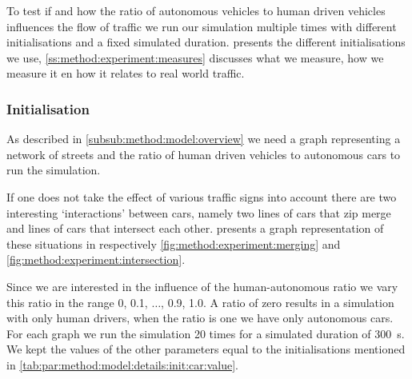 To test if and how the ratio of autonomous vehicles to human driven vehicles influences the flow of traffic we run our simulation multiple times with different initialisations and a fixed simulated duration.  presents the different initialisations we use, \cref{ss:method:experiment:measures} discusses what we measure, how we measure it en how it relates to real world traffic. 

\subsubsection{Initialisation}
\label{ss:method:experiment:init}
As described in \cref{subsub:method:model:overview} we need a graph representing a network of streets and the ratio of human driven vehicles to autonomous cars to run the simulation. 

If one does not take the effect of various traffic signs into account there are two interesting `interactions' between cars, namely two lines of cars that zip merge and lines of cars that intersect each other.  presents a graph representation of these situations in respectively \cref{fig:method:experiment:merging} and \cref{fig:method:experiment:intersection}.

Since we are interested in the influence of the human-autonomous ratio we vary this ratio in the range 0, 0.1, $\dotsc$, 0.9, 1.0. A ratio of zero results in a simulation with only human drivers, when the ratio is one we have only autonomous cars. For each graph we run the simulation 20 times for a simulated duration of \SI{300}{\second}. We kept the values of the other parameters equal to the initialisations mentioned in \cref{tab:par:method:model:details:init:car:value}.

